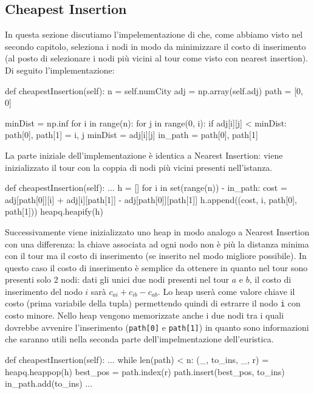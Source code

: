 \documentclass[a4paper,12pt]{report}
\begin{document}
\subsection{Cheapest Insertion}
In questa sezione discutiamo l'impelementazione di  che, come abbiamo visto nel secondo capitolo, seleziona i nodi in modo da minimizzare il costo di inserimento (al posto di selezionare i nodi più vicini al tour come visto con nearest insertion). Di seguito l'implementazione:
\begin{python}
def cheapestInsertion(self):
  n = self.numCity
  adj = np.array(self.adj)
  path = [0, 0]

  minDist = np.inf
  for i in range(n):
      for j in range(0, i):
          if adj[i][j] < minDist:
              path[0], path[1] = i, j
              minDist = adj[i][j]
  in_path = {path[0], path[1]}
\end{python}
La parte iniziale dell'implementazione è identica a Nearest Insertion: viene inizializzato il tour con la coppia di nodi più vicini presenti nell'istanza.
\begin{python}
def cheapestInsertion(self):
  ...
  h = []
  for i in set(range(n)) - in_path:
    cost = adj[path[0]][i] + adj[i][path[1]] - adj[path[0]][path[1]]
    h.append((cost, i, path[0], path[1]))
  heapq.heapify(h)
\end{python}
Successivamente viene inizializzato uno heap in modo analogo a Nearest Insertion con una differenza: la chiave associata ad ogni nodo non è più la distanza minima con il tour ma il costo di inserimento (se inserito nel modo migliore possibile). In questo caso il costo di inserimento è semplice da ottenere in quanto nel tour sono presenti solo 2 nodi: dati gli unici due nodi presenti nel tour $a$ e $b$, il costo di inserimento del nodo $i$ sarà $c_{ai} + c_{ib} - c_{ab}$. Lo heap userà come valore chiave il costo (prima variabile della tupla) permettendo quindi di estrarre il nodo \lstinline!i! con costo minore. Nello heap vengono memorizzate anche i due nodi tra i quali dovrebbe avvenire l'inserimento (\lstinline!path[0]! e \lstinline!path[1]!) in quanto sono informazioni che saranno utili nella seconda parte dell'impelmentazione dell'euristica.
\begin{python}
def cheapestInsertion(self):
  ...
  while len(path) < n:
    (_, to_ins, _, r) = heapq.heappop(h)
    best_pos = path.index(r)
    path.insert(best_pos, to_ins)
    in_path.add(to_ins)
    ...
\end{python}
\end{document}
